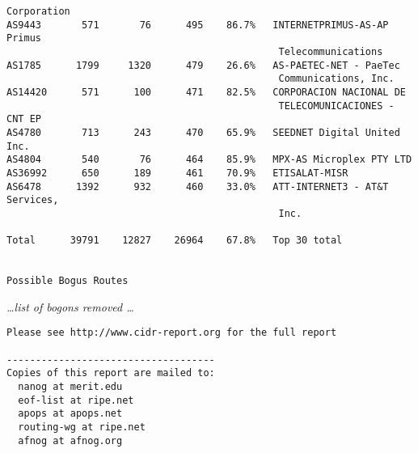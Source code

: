 \begin{lstlisting}[frame=trl]
                                               Corporation
AS9443       571       76      495    86.7%   INTERNETPRIMUS-AS-AP Primus
                                               Telecommunications
AS1785      1799     1320      479    26.6%   AS-PAETEC-NET - PaeTec
                                               Communications, Inc.
AS14420      571      100      471    82.5%   CORPORACION NACIONAL DE
                                               TELECOMUNICACIONES - CNT EP
AS4780       713      243      470    65.9%   SEEDNET Digital United Inc.
AS4804       540       76      464    85.9%   MPX-AS Microplex PTY LTD
AS36992      650      189      461    70.9%   ETISALAT-MISR
AS6478      1392      932      460    33.0%   ATT-INTERNET3 - AT&T Services,
                                               Inc.

Total      39791    12827    26964    67.8%   Top 30 total


Possible Bogus Routes
\end{lstlisting}
\begin{center}
\emph{\ldots list of bogons removed \ldots}
\end{center}
\begin{lstlisting}[frame=brl]
Please see http://www.cidr-report.org for the full report

------------------------------------
Copies of this report are mailed to:
  nanog at merit.edu
  eof-list at ripe.net
  apops at apops.net
  routing-wg at ripe.net
  afnog at afnog.org
\end{lstlisting}

\clearpage
